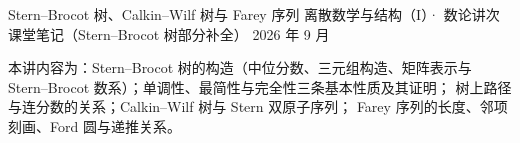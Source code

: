 \documentclass[cjk]{loom}
\begin{document}
\loomcover
  {Stern--Brocot 树、Calkin--Wilf 树与 Farey 序列}
  {离散数学与结构（I）· 数论讲次课堂笔记（Stern--Brocot 树部分补全）}
  {}
  {2026 年 9 月}

\begin{strand}
本讲内容为：Stern--Brocot 树的构造（中位分数、三元组构造、矩阵表示与
Stern--Brocot 数系）；单调性、最简性与完全性三条基本性质及其证明；
树上路径与连分数的关系；Calkin--Wilf 树与 Stern 双原子序列；
Farey 序列的长度、邻项刻画、Ford 圆与递推关系。
\end{strand}

\clearpage
{\small\tableofcontents}

\clearpage






\end{document}
